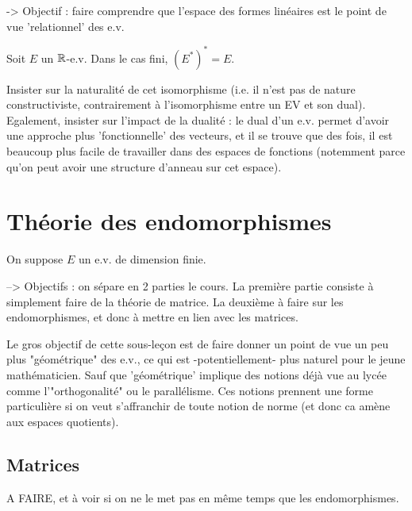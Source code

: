 -> Objectif : faire comprendre que l'espace des formes linéaires est 
le point de vue 'relationnel' des e.v.
\begin{definition}	
\end{definition}

\begin{definition}
\end{definition}

\begin{theorem}
	Soit $E$ un $\operatorname{\mathbb{R}}$-e.v.
	Dans le cas fini, $\left(E^*\right)^* = E$.
\end{theorem}

\begin{remark}
	Insister sur la naturalité de cet isomorphisme (i.e. il n'est pas de nature constructiviste, contrairement à l'isomorphisme entre un EV et son dual).
	Egalement, insister sur l'impact de la dualité : le dual d'un e.v. permet d'avoir 
	une approche plus 'fonctionnelle' des vecteurs, et il se trouve que des fois, il est beaucoup plus
	facile de travailler dans des espaces de fonctions (notemment parce qu'on peut avoir une structure d'anneau sur cet espace).
\end{remark}


\section{Théorie des endomorphismes}

On suppose $E$ un e.v. de dimension finie.

--> Objectifs : on sépare en 2 parties le cours.
La première partie consiste à simplement faire de la théorie de matrice.
La deuxième à faire sur les endomorphismes, et donc à mettre en lien avec les matrices.

Le gros objectif de cette sous-leçon est de faire donner un point de vue un 
peu plus "géométrique" des e.v., ce qui est -potentiellement- plus naturel pour le jeune mathématicien.
Sauf que 'géométrique' implique des notions déjà vue au lycée comme l'"orthogonalité" ou le parallélisme.
Ces notions prennent une forme particulière si on veut s'affranchir de toute notion de norme (et donc ca amène 
aux espaces quotients).

\subsection{Matrices}
A FAIRE, et à voir si on ne le met pas en même temps que les endomorphismes.

